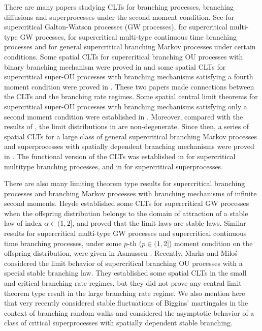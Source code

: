 \documentclass[12pt,a4paper]{amsart}
\theoremstyle{plain}
\theoremstyle{definition}
\numberwithin{equation}{section}
\begin{document}
There are many papers studying CLTs for branching processes, branching diffusions and superprocesses under the second moment condition.
See \cite{Heyde1970A-rate, HeydeBrown1871An-invariance, HeydeLeslie1971Improved} for supercritical Galton-Watson processes (GW processes), \cite{KestenStigum1966Additional,KestenStigum1966A-limit} for supercritical multi-type GW processes, \cite{Athreya1969Limit,Athreya1969LimitB,Athreya1971Some} for supercritical multi-type continuous time branching processes and \cite{AsmussenHering1983Branching} for general supercritical branching Markov processes under certain conditions.
Some spatial CLTs for supercritical branching OU processes with binary branching mechanism were proved in \cite{AdamczakMilos2015CLT} and some spatial CLTs for supercritical super-OU processes with branching mechanisms satisfying a fourth moment condition were proved in \cite{Milos2012Spatial}.
These two papers made connections between the CLTs and the branching rate regimes.
Some spatial central limit theorems for supercritical super-OU  processes with branching mechanisms satisfying only a second moment condition were established in \cite{RenSongZhang2014Central}.
Moreover, compared with the results of \cite{AdamczakMilos2015CLT,Milos2012Spatial}, the limit distributions in \cite{RenSongZhang2014Central} are non-degenerate.
Since then, a series of spatial CLTs for a large class of general supercritical branching Markov processes and superprocesses with spatially dependent branching mechanisms were proved in \cite{RenSongZhang2014CentralB,RenSongZhang2015Central,RenSongZhang2017Central}.
The functional version of the CLTs was established in \cite{Janson2004Functional} for supercritical multitype branching processes, and in \cite{RenSongZhang2017Functional} for supercritical superprocesses.

There are also many limiting theorem type results for supercritical branching processes and branching Markov processes with branching mechanisms of infinite second moments.
Heyde \cite{Heyde1971Some} established some  CLTs for supercritical GW processes when the offspring distribution belongs to the domain of attraction of a stable law of index $\alpha\in (1, 2]$, and proved that the limit laws are stable laws.
Similar results  for supercritical multi-type GW processes and supercritical continuous time branching processes,
under some $p$-th ($p\in(1,2]$) moment condition on the offspring distribution, were given in Asmussen \cite{Asmussen76Convergence}.
Recently, Marks and Milo\'s \cite{MarksMilos2018CLT} considered the limit behavior of supercritical branching OU processes with a special stable branching law.
They established some spatial CLTs in the small and critical branching rate regimes, but they did not prove any central limit theorem type result in the large branching rate regime.
We also mention here that very recently \cite{IksanovKoleskoMeiners2018Stable-like} considered stable fluctuations of Biggins' martingales in the context of branching random walks and \cite{RenSongSun2018Limit} considered the asymptotic behavior of a class of critical superprocesses with spatially dependent stable branching.
\end{document}

